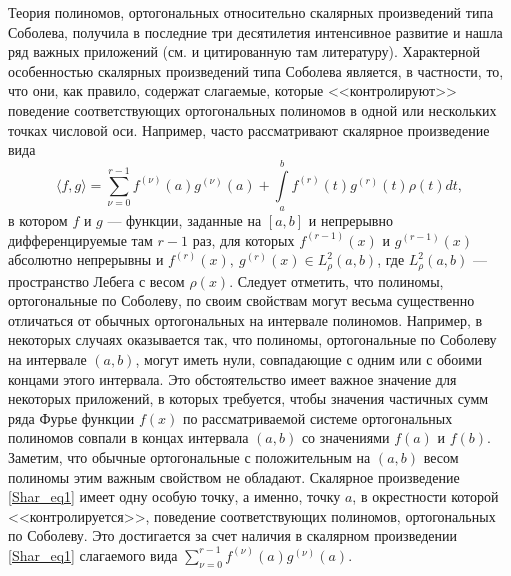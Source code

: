 Теория полиномов, ортогональных относительно скалярных произведений типа Соболева, получила в последние три десятилетия интенсивное развитие и нашла ряд важных приложений (см. \cite{sobleg-IserKoch, sobleg-MarcelAlfaroRezola, charlier-Shar3, sobleg-KwonLittl1, sobleg-KwonLittl2, sobleg-MarcelXu} и цитированную там литературу). Характерной особенностью скалярных произведений типа Соболева является, в частности, то, что они, как правило, содержат слагаемые, которые <<контролируют>> поведение соответствующих ортогональных полиномов в одной или нескольких точках числовой оси. Например, часто рассматривают скалярное произведение вида
\begin{equation}\label{Shar_eq1}
\langle f,g \rangle = \sum_{\nu=0}^{r-1} f^{(\nu)}(a)g^{(\nu)}(a) + \int\limits_{a}^{b} f^{(r)}(t)g^{(r)}(t)\rho(t)dt,
\end{equation}
в котором $f$ и $g$ --- функции, заданные на $[a,b]$ и непрерывно дифференцируемые там $r-1$ раз, для которых $f^{(r-1)}(x)$ и $g^{(r-1)}(x)$ абсолютно непрерывны и $f^{(r)}(x),\ g^{(r)}(x)\in L^2_\rho(a,b)$, где $L^2_\rho(a,b)$ --- пространство Лебега с весом $\rho(x)$.
Следует отметить, что полиномы, ортогональные по Соболеву, по своим свойствам могут весьма существенно отличаться от обычных ортогональных на интервале полиномов. Например, в некоторых случаях оказывается так, что полиномы, ортогональные по Соболеву на интервале $(a,b)$, могут иметь нули, совпадающие с одним или с обоими концами этого интервала. Это обстоятельство имеет важное значение для некоторых приложений, в которых требуется, чтобы значения частичных сумм ряда Фурье функции $f(x)$ по рассматриваемой системе ортогональных полиномов совпали в концах интервала $(a,b)$ со значениями $f(a)$ и $f(b)$. Заметим, что обычные ортогональные с положительным на $(a,b)$ весом полиномы этим важным свойством не обладают. Скалярное произведение \eqref{Shar_eq1} имеет одну особую точку, а именно, точку $a$, в окрестности которой <<контролируется>>, поведение соответствующих полиномов, ортогональных по Соболеву. Это достигается за счет наличия в скалярном произведении \eqref{Shar_eq1} слагаемого вида $\sum\limits_{\nu=0}^{r-1}f^{(\nu)}(a)g^{(\nu)}(a)$.

